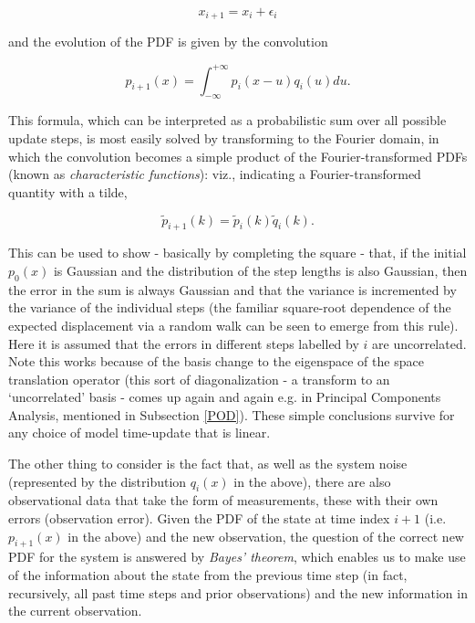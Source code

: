 \begin{equation}
x_{i+1} = x_{i} + \epsilon_i
\end{equation} 

and the evolution of the PDF is given by the convolution

\begin{equation}
p_{i+1}(x) = \int_{-\infty}^{+\infty} p_i(x-u) q_i(u) du.
\end{equation}

This formula, which can be interpreted as a probabilistic sum over all possible update steps, is most easily solved by transforming to the Fourier domain, in which the convolution becomes a simple product of the Fourier-transformed PDFs (known as {\it characteristic functions}): viz., indicating a Fourier-transformed quantity with a tilde,

\begin{equation}
\tilde{p}_{i+1}(k) = \tilde{p}_i(k) \tilde{q}_i(k).
\end{equation}

This can be used to show - basically by completing the square - that, if the initial $p_0(x)$ is Gaussian and the distribution of the step lengths is also Gaussian, then the error in the sum is always Gaussian and that the variance is incremented by the variance of the individual steps (the familiar square-root dependence of the expected displacement via a random walk can be seen to emerge from this rule).  Here it is assumed that the errors in different steps labelled by $i$ are uncorrelated.
Note this works because of the basis change to the eigenspace of the space translation operator (this sort of diagonalization - a transform to an `uncorrelated' basis - comes up again and again e.g. in Principal Components Analysis, mentioned in Subsection \ref{POD}).  
These simple conclusions survive for any choice of model time-update that is linear.

The other thing to consider is the fact that, as well as the system noise (represented by the distribution $q_i(x)$ in the above), there are also observational data that take the form of measurements, these with their own errors (observation error).  
Given the PDF of the state at time index $i+1$ (i.e. $p_{i+1}(x)$ in the above) and the new observation, the question of the correct new PDF for the system is answered by {\it Bayes' theorem}, which enables us to make use of the information about the state from the previous time step (in fact, recursively, all past time steps and prior observations) and the new information in the current observation. 

